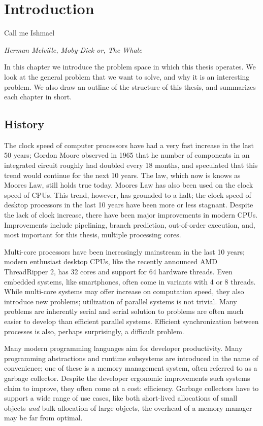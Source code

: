 \chapter{Introduction}

\epigraph{Call me Ishmael}{\textit{Herman Melville, Moby-Dick or, The Whale}}

In this chapter we introduce the problem space in which this thesis operates.
We look at the general problem that we want to solve, and why it is an interesting problem.
We also draw an outline of the structure of this thesis, and summarizes each chapter in short.

\clearpage



\section{History}


The clock speed of computer processors have had a very fast increase in the last 50 years;
Gordon Moore observed in 1965 that he number of components in an integrated circuit roughly had
doubled every 18 months, and speculated that this trend would continue for the next 10 years.
The law, which now is knows as Moores Law, still holds true today.
Moores Law has also been used on the clock speed of CPUs. This trend, however, has grounded to a
halt; the clock speed of desktop processors in the last 10 years have been more or less stagnant.
Despite the lack of clock increase, there have been major improvements in modern CPUs. Improvements
include pipelining, branch prediction, out-of-order execution, and, most important for this thesis,
multiple processing cores.


Multi-core processors have been increasingly mainstream in the last 10 years; modern enthusiast
desktop CPUs, like the recently announced AMD ThreadRipper 2, has 32 cores and support for 64
hardware threads. Even embedded systems, like smartphones, often come in variants with 4 or 8
threads. While multi-core systems may offer increase on computation speed, they also introduce new
problems; utilization of parallel systems is not trivial. Many problems are inherently serial and
serial solution to problems are often much easier to develop than efficient parallel systems.
Efficient synchronization between processes is also, perhaps surprisingly, a difficult problem.


Many modern programming languages aim for developer productivity. Many programming abstractions and
runtime subsystems are introduced in the name of convenience; one of these is a memory management
system, often referred to as a garbage collector. Despite the developer ergonomic improvements such
systems claim to improve, they often come at a cost: efficiency. Garbage collectors have to support
a wide range of use cases, like both short-lived allocations of small objects \emph{and} bulk
allocation of large objects, the overhead of a memory manager may be far from optimal.



